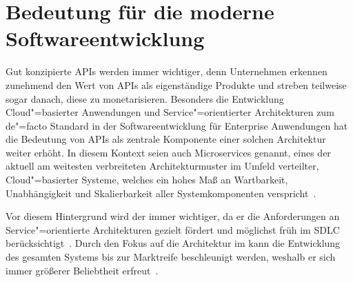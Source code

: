 \section{Bedeutung für die moderne Softwareentwicklung}
Gut konzipierte \acp{API} werden immer wichtiger, denn Unternehmen erkennen zunehmend den Wert von \acp{API} als eigenständige Produkte und streben teilweise sogar danach, diese zu monetarisieren.
Besonders die Entwicklung Cloud"=basierter Anwendungen und Service"=orientierter Architekturen zum de"=facto Standard in der Softwareentwicklung für Enterprise Anwendungen hat die Bedeutung von \acp{API} als zentrale Komponente einer solchen Architektur weiter erhöht.
In diesem Kontext seien auch Microservices genannt, eines der aktuell am weitesten verbreiteten Architekturmuster im Umfeld verteilter, Cloud"=basierter Systeme, welches ein hohes Maß an Wartbarkeit, Unabhängigkeit und Skalierbarkeit aller Systemkomponenten verspricht~\cites[73"=75]{bea22}[5]{kul23}.

Vor diesem Hintergrund wird der \AFA immer wichtiger, da er die Anforderungen an Service"=orientierte Architekturen gezielt fördert und möglichst früh im \ac{SDLC} berücksichtigt~\cite[1627]{cha21}.
Durch den Fokus auf die Architektur im \AFA kann die Entwicklung des gesamten Systems bis zur Marktreife beschleunigt werden, weshalb er sich immer größerer Beliebtheit erfreut~\cite[76]{bea22}.